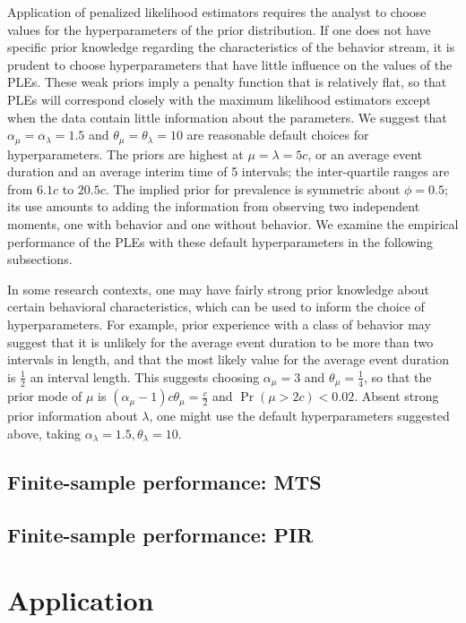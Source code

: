 \documentclass[man, noextraspace, floatsintext]{apa6}\usepackage[]{graphicx}\usepackage[]{color}
\begin{document}
Application of penalized likelihood estimators requires the analyst to choose values for the hyperparameters of the prior distribution. If one does not have specific prior knowledge regarding the characteristics of the behavior stream, it is prudent to choose hyperparameters that have little influence on the values of the PLEs. These weak priors imply a penalty function that is relatively flat, so that PLEs will correspond closely with the maximum likelihood estimators except when the data contain little information about the parameters. We suggest that $\alpha_\mu = \alpha_\lambda = 1.5$ and $\theta_\mu = \theta_\lambda = 10$ are reasonable default choices for hyperparameters. The priors are highest at $\mu = \lambda = 5 c$, or an average event duration and an average interim time of 5 intervals; the inter-quartile ranges are from $6.1 c$ to $20.5 c$. The implied prior for prevalence is symmetric about $\phi = 0.5$; its use amounts to adding the information from observing two independent moments, one with behavior and one without behavior. We examine the empirical performance of the PLEs with these default hyperparameters in the following subsections.



In some research contexts, one may have fairly strong prior knowledge about certain behavioral characteristics, which can be used to inform the choice of hyperparameters. 
For example, prior experience with a class of behavior may suggest that it is unlikely for the average event duration to be more than two intervals in length, and that the most likely value for the average event duration is $\frac{1}{2}$ an interval length. 
This suggests choosing $\alpha_\mu = 3$ and $\theta_\mu = \frac{1}{4}$, so that the prior mode of $\mu$ is $\left(\alpha_\mu - 1\right) c \theta_\mu = \frac{c}{2}$ and $\Pr(\mu > 2c) < 0.02$.
Absent strong prior information about $\lambda$, one might use the default hyperparameters suggested above, taking $\alpha_\lambda = 1.5, \theta_\lambda = 10$. 

\subsection{Finite-sample performance: MTS}

\subsection{Finite-sample performance: PIR}

\section{Application}
\label{sec:application}
\end{document}
